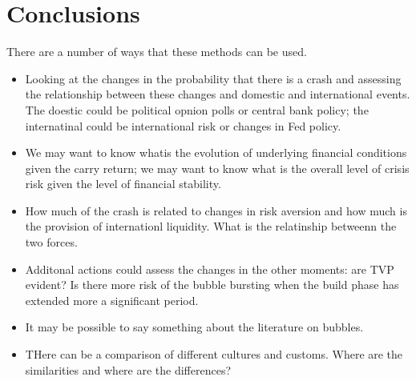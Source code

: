 \documentclass[12pt, a4paper, oneside]{article} %
\begin{document}
\section{Conclusions}
There are a number of ways that these methods can be used. 
\begin{itemize}
\item Looking at the changes in the probability that there is a crash and assessing the relationship between these changes and domestic and international events.  The doestic could be political opnion polls or central bank policy; the internatinal could be international risk or changes in Fed policy.  
\item We may want to know whatis the evolution of underlying financial conditions given the carry return; we may want to know what is the overall level of crisis risk given the level of financial stability.  
\item How much of the crash is related to changes in risk aversion and how much is the provision of internationl liquidity.  What is the relatinship betweenn the two forces. 
\item Additonal actions could assess the changes in the other moments:  are TVP evident?  Is there more risk of the bubble bursting when the build phase has extended more a significant period. 
\item It may be possible to say something about the literature on bubbles. 
\item THere can be a comparison of different cultures and customs. Where are the similarities and where are the differences?  
\end{itemize}


\end{document}
